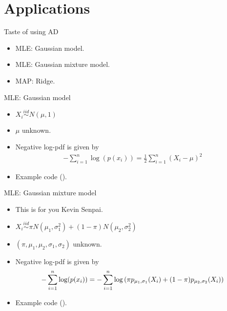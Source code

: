 \section{Applications}
\frame{\tableofcontents[currentsection]}

\begin{frame}{Taste of using AD}
\begin{itemize}
    \item MLE: Gaussian model.
    \item MLE: Gaussian mixture model.
    \item MAP: Ridge.
\end{itemize}
\end{frame}

\begin{frame}{MLE: Gaussian model}
\begin{itemize}
    \item $X_i \stackrel{iid}{\sim} N(\mu, 1)$ 
    \item $\mu$ unknown.
    \item Negative log-pdf is given by
    \begin{align*}
        -\sum\limits_{i=1}^n \log(p(x_i))
        =
        \frac{1}{2} \sum\limits_{i=1}^n (X_i - \mu)^2
    \end{align*}
    \item Example code ().
\end{itemize}
\end{frame}

\begin{frame}{MLE: Gaussian mixture model}
\begin{itemize}
    \item<2-> This is for you Kevin Senpai.
    \item<3-> $X_i \stackrel{iid}{\sim} \pi N(\mu_1, \sigma_1^2) + (1-\pi) N(\mu_2, \sigma_2^2)$ 
    \item<3-> $(\pi, \mu_1, \mu_2, \sigma_1, \sigma_2)$ unknown.
    \item<3-> Negative log-pdf is given by
    \begin{align*}
        -\sum\limits_{i=1}^n \log(p(x_i))
        =
        -\sum\limits_{i=1}^n \log\left(
            \pi p_{\mu_1, \sigma_1}(X_i)
            + (1-\pi) p_{\mu_2, \sigma_2}(X_i)
        \right)
    \end{align*}
    \item<3-> Example code ().
\end{itemize}
\end{frame}

